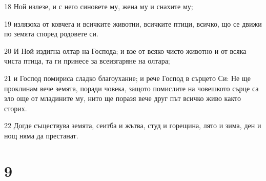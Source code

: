 \par 18 Ной излезе, и с него синовете му, жена му и снахите му;
\par 19 излязоха от ковчега и всичките животни, всичките птици, всичко, що се движи по земята според родовете си.
\par 20 И Ной издигна олтар на Господа; и взе от всяко чисто животно и от всяка чиста птица, та ги принесе за всеизгаряне на олтара;
\par 21 и Господ помириса сладко благоухание; и рече Господ в сърцето Си: Не ще проклинам вече земята, поради човека, защото помислите на човешкото сърце са зло още от младините му, нито ще поразя вече друг път всичко живо както сторих.
\par 22 Догде съществува земята, сеитба и жътва, студ и горещина, лято и зима, ден и нощ няма да престанат.

\chapter{9}


